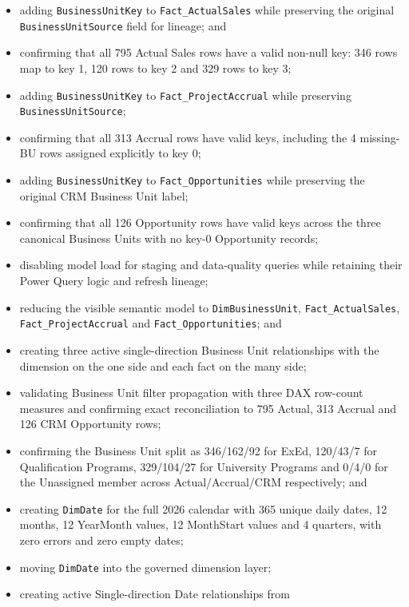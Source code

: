 \documentclass[11pt,a4paper]{article}
\begin{document}
\begin{itemize}[leftmargin=7mm,itemsep=3pt]
    Business Units and key 0 to \texttt{Unassigned / Missing BU};
    \item adding \texttt{BusinessUnitKey} to \texttt{Fact\_ActualSales} while
    preserving the original \texttt{BusinessUnitSource} field for lineage; and
    \item confirming that all 795 Actual Sales rows have a valid non-null key:
    346 rows map to key 1, 120 rows to key 2 and 329 rows to key 3;
    \item adding \texttt{BusinessUnitKey} to \texttt{Fact\_ProjectAccrual} while
    preserving \texttt{BusinessUnitSource};
    \item confirming that all 313 Accrual rows have valid keys, including the
    4 missing-BU rows assigned explicitly to key 0;
    \item adding \texttt{BusinessUnitKey} to \texttt{Fact\_Opportunities} while
    preserving the original CRM Business Unit label;
    \item confirming that all 126 Opportunity rows have valid keys across the three
    canonical Business Units with no key-0 Opportunity records;
    \item disabling model load for staging and data-quality queries while retaining
    their Power Query logic and refresh lineage;
    \item reducing the visible semantic model to \texttt{DimBusinessUnit},
    \texttt{Fact\_ActualSales}, \texttt{Fact\_ProjectAccrual} and
    \texttt{Fact\_Opportunities}; and
    \item creating three active single-direction Business Unit relationships with
    the dimension on the one side and each fact on the many side;
    \item validating Business Unit filter propagation with three DAX row-count
    measures and confirming exact reconciliation to 795 Actual, 313 Accrual and
    126 CRM Opportunity rows;
    \item confirming the Business Unit split as 346/162/92 for ExEd,
    120/43/7 for Qualification Programs, 329/104/27 for University Programs and
    0/4/0 for the Unassigned member across Actual/Accrual/CRM respectively; and
    \item creating \texttt{DimDate} for the full 2026 calendar with 365 unique
    daily dates, 12 months, 12 YearMonth values, 12 MonthStart values and
    4 quarters, with zero errors and zero empty dates;
    \item moving \texttt{DimDate} into the governed dimension layer;
    \item creating active Single-direction Date relationships from

\end{itemize}
\end{document}
